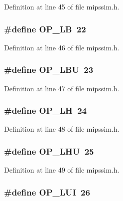 Definition at line 45 of file mipssim.\+h.

\subsubsection[{O\+P\+\_\+\+LB}]{\setlength{\rightskip}{0pt plus 5cm}\#define O\+P\+\_\+\+LB~22}\label{mipssim_8h_a93494f5e90e6d528d7fb2e7a670537a9}


Definition at line 46 of file mipssim.\+h.

\subsubsection[{O\+P\+\_\+\+L\+BU}]{\setlength{\rightskip}{0pt plus 5cm}\#define O\+P\+\_\+\+L\+BU~23}\label{mipssim_8h_a728bcfd25a42768be0e51ff5f3cc2219}


Definition at line 47 of file mipssim.\+h.

\subsubsection[{O\+P\+\_\+\+LH}]{\setlength{\rightskip}{0pt plus 5cm}\#define O\+P\+\_\+\+LH~24}\label{mipssim_8h_a4c3bc807944700d21139411bdf89d140}


Definition at line 48 of file mipssim.\+h.

\subsubsection[{O\+P\+\_\+\+L\+HU}]{\setlength{\rightskip}{0pt plus 5cm}\#define O\+P\+\_\+\+L\+HU~25}\label{mipssim_8h_a8e17f66a1fbb3ab9d48ef4b68064ee89}


Definition at line 49 of file mipssim.\+h.

\subsubsection[{O\+P\+\_\+\+L\+UI}]{\setlength{\rightskip}{0pt plus 5cm}\#define O\+P\+\_\+\+L\+UI~26}\label{mipssim_8h_ae1569a663192bf2310d5a103967c33a8}


